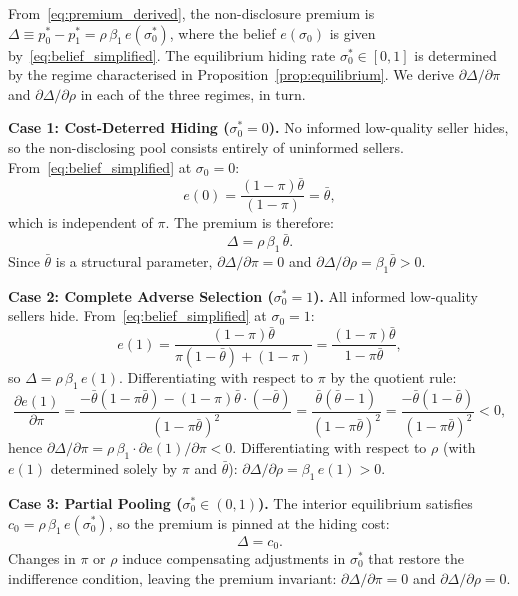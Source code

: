From~\eqref{eq:premium_derived}, the non-disclosure premium is $\Delta\equiv p_0^*-p_1^*=\rho\,\beta_1\,e(\sigma_0^*)$, where the belief $e(\sigma_0)$ is given by~\eqref{eq:belief_simplified}. The equilibrium hiding rate $\sigma_0^*\in[0,1]$ is determined by the regime characterised in Proposition~\ref{prop:equilibrium}. We derive $\partial\Delta/\partial\pi$ and $\partial\Delta/\partial\rho$ in each of the three regimes, in turn.

\medskip
\textbf{Case 1: Cost-Deterred Hiding ($\sigma_0^*=0$).}
No informed low-quality seller hides, so the non-disclosing pool consists entirely of uninformed sellers. From~\eqref{eq:belief_simplified} at $\sigma_0=0$:
\begin{equation}
    e(0) = \frac{(1-\pi)\bar{\theta}}{(1-\pi)} = \bar{\theta},
\end{equation}
which is independent of $\pi$. The premium is therefore:
\begin{equation}
    \Delta = \rho\,\beta_1\,\bar{\theta}.
\end{equation}
Since $\bar{\theta}$ is a structural parameter, $\partial\Delta/\partial\pi=0$ and $\partial\Delta/\partial\rho=\beta_1\bar{\theta}>0$.

\medskip
\textbf{Case 2: Complete Adverse Selection ($\sigma_0^*=1$).}
All informed low-quality sellers hide. From~\eqref{eq:belief_simplified} at $\sigma_0=1$:
\begin{equation}
    e(1) = \frac{(1-\pi)\bar{\theta}}{\pi(1-\bar{\theta})+(1-\pi)} = \frac{(1-\pi)\bar{\theta}}{1-\pi\bar{\theta}},
\end{equation}
so $\Delta=\rho\,\beta_1\,e(1)$. Differentiating with respect to $\pi$ by the quotient rule:
\begin{equation}
    \frac{\partial e(1)}{\partial\pi}
        = \frac{-\bar{\theta}(1-\pi\bar{\theta})-(1-\pi)\bar{\theta}\cdot(-\bar{\theta})}{(1-\pi\bar{\theta})^2}
        = \frac{\bar{\theta}(\bar{\theta}-1)}{(1-\pi\bar{\theta})^2}
        = \frac{-\bar{\theta}(1-\bar{\theta})}{(1-\pi\bar{\theta})^2} < 0,
\end{equation}
hence $\partial\Delta/\partial\pi = \rho\,\beta_1\cdot\partial e(1)/\partial\pi < 0$.
Differentiating with respect to $\rho$ (with $e(1)$ determined solely by $\pi$ and $\bar\theta$):
$\partial\Delta/\partial\rho=\beta_1\,e(1)>0$.

\medskip
\textbf{Case 3: Partial Pooling ($\sigma_0^*\in(0,1)$).}
The interior equilibrium satisfies $c_0=\rho\,\beta_1\,e(\sigma_0^*)$, so the premium is pinned at the hiding cost:
\begin{equation}
    \Delta = c_0.
\end{equation}
Changes in $\pi$ or $\rho$ induce compensating adjustments in $\sigma_0^*$ that restore the indifference condition, leaving the premium invariant: $\partial\Delta/\partial\pi=0$ and $\partial\Delta/\partial\rho=0$.

